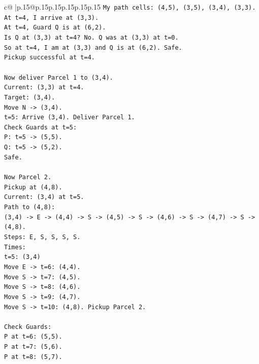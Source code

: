\documentclass{article}
\begin{document}
{\begin{supertabular}{c@{$\;$}|p{.15\linewidth}@{}p{.15\linewidth}p{.15\linewidth}p{.15\linewidth}p{.15\linewidth}p{.15\linewidth}}
{{{\texttt{My path cells: (4,5), (3,5), (3,4), (3,3).} \\
\texttt{At t=4, I arrive at (3,3).} \\
\texttt{At t=4, Guard Q is at (6,2).} \\
\texttt{Is Q at (3,3) at t=4? No. Q was at (3,3) at t=0.} \\
\texttt{So at t=4, I am at (3,3) and Q is at (6,2). Safe.} \\
\texttt{Pickup successful at t=4.} \\
\\ 
\texttt{Now deliver Parcel 1 to (3,4).} \\
\texttt{Current: (3,3) at t=4.} \\
\texttt{Target: (3,4).} \\
\texttt{Move N {-}> (3,4).} \\
\texttt{t=5: Arrive (3,4). Deliver Parcel 1.} \\
\texttt{Check Guards at t=5:} \\
\texttt{P: t=5 {-}> (5,5).} \\
\texttt{Q: t=5 {-}> (5,2).} \\
\texttt{Safe.} \\
\\ 
\texttt{Now Parcel 2.} \\
\texttt{Pickup at (4,8).} \\
\texttt{Current: (3,4) at t=5.} \\
\texttt{Path to (4,8):} \\
\texttt{(3,4) {-}> E {-}> (4,4) {-}> S {-}> (4,5) {-}> S {-}> (4,6) {-}> S {-}> (4,7) {-}> S {-}> (4,8).} \\
\texttt{Steps: E, S, S, S, S.} \\
\texttt{Times:} \\
\texttt{t=5: (3,4)} \\
\texttt{Move E {-}> t=6: (4,4).} \\
\texttt{Move S {-}> t=7: (4,5).} \\
\texttt{Move S {-}> t=8: (4,6).} \\
\texttt{Move S {-}> t=9: (4,7).} \\
\texttt{Move S {-}> t=10: (4,8). Pickup Parcel 2.} \\
\\ 
\texttt{Check Guards:} \\
\texttt{P at t=6: (5,5).} \\
\texttt{P at t=7: (5,6).} \\
\texttt{P at t=8: (5,7).} \\
}}}
\end{supertabular}}
\end{document}
